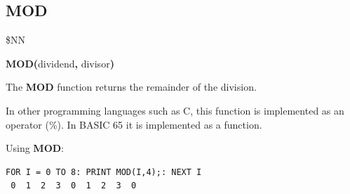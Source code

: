 
\newpage
\subsection{MOD}
\begin{description}[leftmargin=2cm,style=nextline]
\item [Token:] \$NN
\item [Format:] {\bf MOD(}dividend{\bf,} divisor{\bf)}
\item [Usage:] The {\bf MOD} function returns the remainder of the
      division.
\item [Remarks:] In other programming languages such as C, this function
      is implemented as an operator (\%). In BASIC 65 it is implemented as a function.

\item [Example:] Using {\bf MOD}:
\begin{tcolorbox}[colback=black,coltext=white]
\verbatimfont{\codefont}
\begin{verbatim}
FOR I = 0 TO 8: PRINT MOD(I,4);: NEXT I
 0  1  2  3  0  1  2  3  0
\end{verbatim}
\end{tcolorbox}
\end{description}


\newpage
